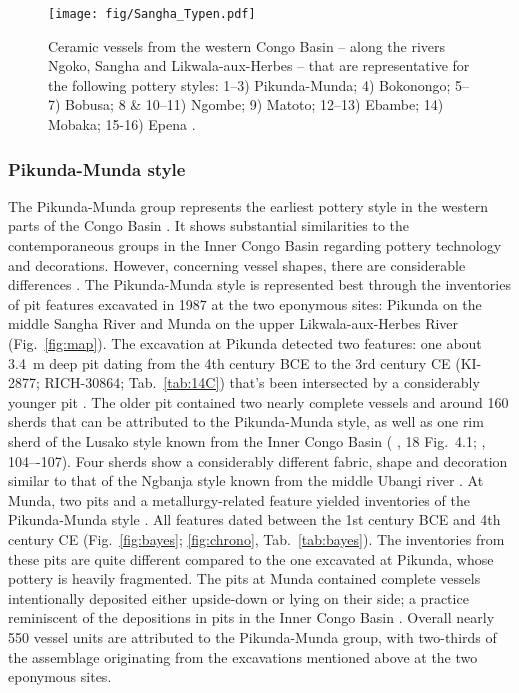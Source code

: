 \documentclass[smallextended,natbib]{svjour3}       %
\begin{document}
\begin{figure}[!tb]
	\texttt{[image: fig/Sangha\_Typen.pdf]}
	\caption{Ceramic vessels from the western Congo Basin -- along the rivers Ngoko, Sangha and Likwala-aux-Herbes -- that are representative for the following pottery styles: 1--3) Pikunda-Munda; 4) Bokonongo; 5--7) Bobusa; 8 \& 10--11) Ngombe; 9) Matoto; 12--13) Ebambe; 14) Mobaka; 15-16) Epena \citep[114--144, 162--168]{Seidensticker.2021e}.}
	\label{fig:sangha}
\end{figure}

\subsubsection*{Pikunda-Munda style}

The Pikunda-Munda group represents the earliest pottery style in the western parts of the Congo Basin \citep[114-120]{Seidensticker.2021e}. It shows substantial similarities to the contemporaneous groups in the Inner Congo Basin regarding pottery technology and decorations. However, concerning vessel shapes, there are considerable differences \citep[107 Ftn.~4]{Wotzka.1995}. The Pikunda-Munda style is represented best through the inventories of pit features excavated in 1987 at the two eponymous sites: Pikunda on the middle Sangha River and Munda on the upper Likwala-aux-Herbes River (Fig.~\ref{fig:map}). The excavation at Pikunda detected two features: one about 3.4~m deep pit dating from the 4th century BCE to the 3rd century CE (KI-2877; RICH-30864; Tab.~\ref{tab:14C}) that's been intersected by a considerably younger pit \citep[288--300]{Seidensticker.2021e}. The older pit contained two nearly complete vessels and around 160 sherds that can be attributed to the Pikunda-Munda style, as well as one rim sherd of the Lusako style known from the Inner Congo Basin (\citeauthor{Eggert.1992} \citeyear{Eggert.1992}, 18 Fig.~4.1; \citeauthor{Wotzka.1995} \citeyear{Wotzka.1995}, 104–-107). Four sherds show a considerably different fabric, shape and decoration similar to that of the Ngbanja style known from the middle Ubangi river \citep[296 Tab.~34]{Seidensticker.2021e}. At Munda, two pits and a metallurgy-related feature yielded inventories of the Pikunda-Munda style \citep[321--339]{Seidensticker.2021e}. All features dated between the 1st century BCE and 4th century CE (Fig.~\ref{fig:bayes}; \ref{fig:chrono}, Tab.~\ref{tab:bayes}). The inventories from these pits are quite different compared to the one excavated at Pikunda, whose pottery is heavily fragmented. The pits at Munda contained complete vessels intentionally deposited either upside-down or lying on their side; a practice reminiscent of the depositions in pits in the Inner Congo Basin \citep{Wotzka.1993}. Overall nearly 550 vessel units are attributed to the Pikunda-Munda group, with two-thirds of the assemblage originating from the excavations mentioned above at the two eponymous sites.
\end{document}
